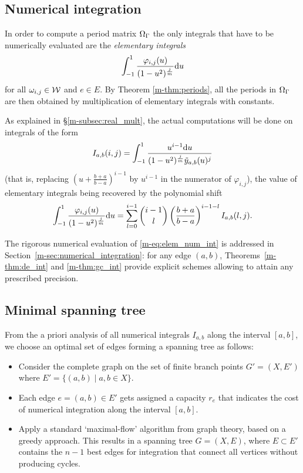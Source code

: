 \documentclass[main.tex]{subfiles}
\begin{document}
   \subsection{Numerical integration}\label{subsec:numerical_integration}

   In order to compute a period matrix $\Omega_{\Gamma}$ the only integrals that have to
   be numerically evaluated are
   the \emph{elementary integrals}
   \begin{equation}\label{eq:elem_ints}
       \int_{-1}^1 \frac{\varphi_{i,j}(u)}{(1-u^2)^{\frac{j}{m}}} \mathrm d u
   \end{equation}
   for all $\omega_{i,j} \in \mathcal{W}$ and $e \in E$. By Theorem \ref{m-thm:periods}, all the periods in $\Omega_{\Gamma}$ are
   then obtained by multiplication of elementary integrals with constants.

 As explained in \S \ref{m-subsec:real_mult}, the actual computations will be done on integrals of the form
\begin{equation}
    \label{eq:elem_num_int}
    I_{a,b}(i,j) = \int_{-1}^1\frac{u^{i-1}\mathrm d u}{(1-u^2)^{\frac jm}\tilde{y}_{a,b}(u)^j}
\end{equation}
(that is, replacing $(u+\frac{b+a}{b-a})^{i-1}$ by $u^{i-1}$ in the numerator of $\varphi_{i,j}$),
the value of elementary integrals being recovered by the polynomial shift
\begin{equation}
    \label{eq:polshift}
    \int_{-1}^1\frac{\varphi_{i,j}(u)}{(1-u^2)^{\frac jm}}\mathrm d u
    = \sum_{l=0}^{i-1} {i-1 \choose l} \left(\frac{b+a}{b-a}\right)^{i-1-l} I_{a,b}(l,j).
\end{equation}

The rigorous numerical evaluation of \eqref{m-eq:elem_num_int} is
addressed in Section~\ref{m-sec:numerical_integration}: for any edge $(a,b)$,
Theorems~\ref{m-thm:de_int} and \ref{m-thm:gc_int} provide
explicit schemes allowing to attain any prescribed precision.

  \subsection{Minimal spanning tree}\label{subsec:spanning_tree}


  From the a priori analysis of all numerical integrals $I_{a,b}$ along
  the interval $[a,b]$, we choose an optimal set of edges forming a spanning tree as follows:
  \begin{itemize}
      \item
   Consider the complete graph on the set of finite branch points $G' = (X,E')$ where
   $E' = \{  (a,b)  \mid  a,b \in X \}$.
      \item
   Each edge $e = (a,b) \in E'$ gets assigned a capacity $r_e$ that indicates
   the cost of numerical integration along the interval $[a,b]$.
   \item
   Apply a standard `maximal-flow' algorithm from graph theory, based on a greedy approach.
   This results in a spanning tree $G = (X,E)$, where $E \subset E'$ contains the $n-1$ best edges
   for integration that connect all vertices without producing cycles.
  \end{itemize}
\end{document}

